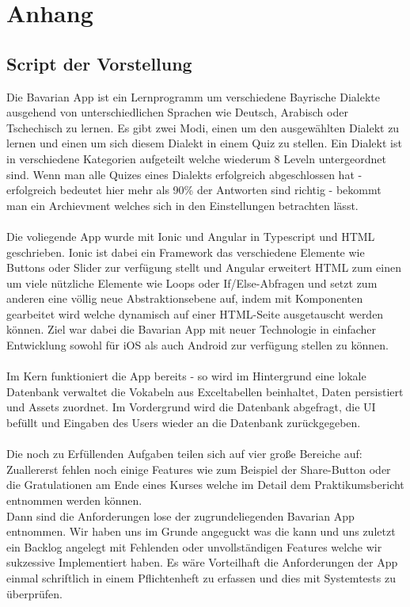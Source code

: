 
\section{Anhang}
\subsection{Script der Vorstellung}
Die Bavarian App ist ein Lernprogramm um verschiedene Bayrische Dialekte ausgehend von unterschiedlichen Sprachen wie Deutsch, Arabisch oder Tschechisch zu lernen. Es gibt zwei Modi, einen um den ausgewählten Dialekt zu lernen und einen um sich diesem Dialekt in einem Quiz zu stellen. Ein Dialekt ist in verschiedene Kategorien aufgeteilt welche wiederum 8 Leveln untergeordnet sind. Wenn man alle Quizes eines Dialekts erfolgreich abgeschlossen hat - erfolgreich bedeutet hier mehr als 90\% der Antworten sind richtig - bekommt man ein Archievment welches sich in den Einstellungen betrachten lässt.\\\\
Die voliegende App wurde mit Ionic und Angular in Typescript und HTML geschrieben. Ionic ist dabei ein Framework das verschiedene Elemente wie Buttons oder Slider zur verfügung stellt und Angular erweitert HTML zum einen um viele nützliche Elemente wie Loops oder If/Else-Abfragen und setzt zum anderen eine völlig neue Abstraktionsebene auf, indem mit Komponenten gearbeitet wird welche dynamisch auf einer HTML-Seite ausgetauscht werden können. Ziel war dabei die Bavarian App mit neuer Technologie in einfacher Entwicklung sowohl für iOS als auch Android zur verfügung stellen zu können.\\\\
Im Kern funktioniert die App bereits - so wird im Hintergrund eine lokale Datenbank verwaltet die Vokabeln aus Exceltabellen beinhaltet, Daten persistiert und Assets zuordnet. Im Vordergrund wird die Datenbank abgefragt, die UI befüllt und Eingaben des Users wieder an die Datenbank zurückgegeben.\\\\Die noch zu Erfüllenden Aufgaben teilen sich auf vier große Bereiche auf:\\
Zuallererst fehlen noch einige Features wie zum Beispiel der Share-Button oder die Gratulationen am Ende eines Kurses welche im Detail dem Praktikumsbericht entnommen werden können.\\
Dann sind die Anforderungen lose der zugrundeliegenden \glqq Bavarian App\grqq{} entnommen. Wir haben uns im Grunde angeguckt was die kann und uns zuletzt ein Backlog angelegt mit Fehlenden oder unvollständigen Features welche wir sukzessive Implementiert haben. Es wäre Vorteilhaft die Anforderungen der App einmal schriftlich in einem Pflichtenheft zu erfassen und dies mit Systemtests zu überprüfen.\\
